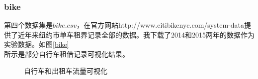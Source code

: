 \documentclass[a4paper, UTF8]{article}
\begin{document}
\begin{CJK}{UTF8}{gbsn}
\subsubsection*{bike}
第四个数据集是$bike.csv$，在官方网站http://www.citibikenyc.com/system-data提供了近年来纽约市单车租界记录全部的数据。我下载了2014和2015两年的数据作为实验数据。如图\ref{bike}\\所示是部分自行车租借记录可视化结果。
\begin{figure}[ht]
\centering
{}
\caption{自行车和出租车流量可视化}
\end{figure}

\end{CJK}
\end{document}
